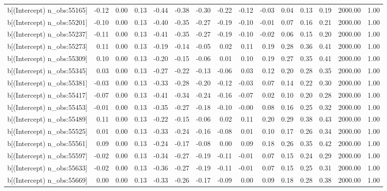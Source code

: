 \begin{table}[ht]
\begin{tabular}{rrrrrrrrrrrrrrr}
  b[(Intercept) n\_obs:55165] & -0.12 & 0.00 & 0.13 & -0.44 & -0.38 & -0.30 & -0.22 & -0.12 & -0.03 & 0.04 & 0.13 & 0.19 & 2000.00 & 1.00 \\ 
  b[(Intercept) n\_obs:55201] & -0.10 & 0.00 & 0.13 & -0.40 & -0.35 & -0.27 & -0.19 & -0.10 & -0.01 & 0.07 & 0.16 & 0.21 & 2000.00 & 1.00 \\ 
  b[(Intercept) n\_obs:55237] & -0.11 & 0.00 & 0.13 & -0.41 & -0.35 & -0.27 & -0.19 & -0.10 & -0.02 & 0.06 & 0.15 & 0.20 & 2000.00 & 1.00 \\ 
  b[(Intercept) n\_obs:55273] & 0.11 & 0.00 & 0.13 & -0.19 & -0.14 & -0.05 & 0.02 & 0.11 & 0.19 & 0.28 & 0.36 & 0.41 & 2000.00 & 1.00 \\ 
  b[(Intercept) n\_obs:55309] & 0.10 & 0.00 & 0.13 & -0.20 & -0.15 & -0.06 & 0.01 & 0.10 & 0.19 & 0.27 & 0.35 & 0.41 & 2000.00 & 1.00 \\ 
  b[(Intercept) n\_obs:55345] & 0.03 & 0.00 & 0.13 & -0.27 & -0.22 & -0.13 & -0.06 & 0.03 & 0.12 & 0.20 & 0.28 & 0.35 & 2000.00 & 1.00 \\ 
  b[(Intercept) n\_obs:55381] & -0.03 & 0.00 & 0.13 & -0.33 & -0.28 & -0.20 & -0.12 & -0.03 & 0.07 & 0.14 & 0.22 & 0.30 & 2000.00 & 1.00 \\ 
  b[(Intercept) n\_obs:55417] & -0.07 & 0.00 & 0.13 & -0.41 & -0.34 & -0.24 & -0.16 & -0.07 & 0.02 & 0.10 & 0.20 & 0.28 & 2000.00 & 1.00 \\ 
  b[(Intercept) n\_obs:55453] & -0.01 & 0.00 & 0.13 & -0.35 & -0.27 & -0.18 & -0.10 & -0.00 & 0.08 & 0.16 & 0.25 & 0.32 & 2000.00 & 1.00 \\ 
  b[(Intercept) n\_obs:55489] & 0.11 & 0.00 & 0.13 & -0.22 & -0.15 & -0.06 & 0.02 & 0.11 & 0.20 & 0.29 & 0.38 & 0.43 & 2000.00 & 1.00 \\ 
  b[(Intercept) n\_obs:55525] & 0.01 & 0.00 & 0.13 & -0.33 & -0.24 & -0.16 & -0.08 & 0.01 & 0.10 & 0.17 & 0.26 & 0.34 & 2000.00 & 1.00 \\ 
  b[(Intercept) n\_obs:55561] & 0.09 & 0.00 & 0.13 & -0.24 & -0.17 & -0.08 & 0.00 & 0.09 & 0.18 & 0.26 & 0.35 & 0.42 & 2000.00 & 1.00 \\ 
  b[(Intercept) n\_obs:55597] & -0.02 & 0.00 & 0.13 & -0.34 & -0.27 & -0.19 & -0.11 & -0.01 & 0.07 & 0.15 & 0.24 & 0.29 & 2000.00 & 1.00 \\ 
  b[(Intercept) n\_obs:55633] & -0.02 & 0.00 & 0.13 & -0.36 & -0.27 & -0.19 & -0.11 & -0.01 & 0.07 & 0.15 & 0.25 & 0.31 & 2000.00 & 1.00 \\ 
  b[(Intercept) n\_obs:55669] & 0.00 & 0.00 & 0.13 & -0.33 & -0.26 & -0.17 & -0.09 & 0.00 & 0.09 & 0.18 & 0.28 & 0.38 & 2000.00 & 1.00 \\ 

\end{tabular}
\end{table}
